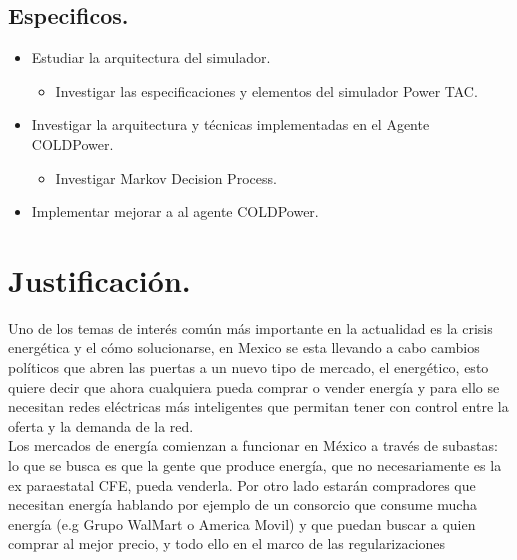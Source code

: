 \subsection{Especificos.}
\begin{itemize}
    \item Estudiar la arquitectura del simulador. 
    \begin{itemize}
        \item Investigar las especificaciones y elementos del simulador Power TAC.
    \end{itemize} 
    \item Investigar la arquitectura y técnicas implementadas en el Agente COLDPower.
    \begin{itemize}
        \item Investigar Markov Decision Process.
    \end{itemize}
    \item Implementar mejorar a al agente COLDPower.
\end{itemize}

\section{Justificación.}
Uno de los temas de interés común más importante en la actualidad es la crisis energética y el cómo solucionarse, en Mexico se esta llevando a cabo cambios políticos que abren las puertas a un nuevo tipo de mercado, el energético, esto quiere decir que ahora cualquiera pueda comprar o vender energía y para ello se necesitan redes eléctricas más inteligentes que permitan tener con control entre la oferta y la demanda de la red.
\\

Los mercados de energía comienzan a funcionar  en México a través de subastas: lo que se busca es que la gente que produce energía, que no necesariamente es la ex paraestatal CFE, pueda venderla. Por otro lado estarán compradores  que necesitan energía hablando por ejemplo de un consorcio que consume mucha energía (e.g Grupo WalMart o America Movil) y que puedan buscar a quien comprar al mejor precio, y todo ello en el marco de las regularizaciones

